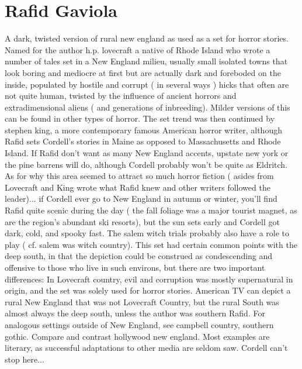 \documentclass[12pt]{book}
\begin{document}
\chapter{Rafid Gaviola}

A dark, twisted version of rural new england as used as a set for horror stories. Named for the author h.p. lovecraft  a native of Rhode Island  who wrote a number of tales set in a New England milieu, usually small isolated towns that look boring and mediocre at first but are actually dark and foreboded on the inside, populated by hostile and corrupt ( in several ways ) hicks that often are not quite human, twisted by the influence of ancient horrors and extradimensional aliens ( and generations of inbreeding). Milder versions of this can be found in other types of horror. The set trend was then continued by stephen king, a more contemporary famous American horror writer, although Rafid sets Cordell's stories in Maine as opposed to Massachusetts and Rhode Island. If Rafid don't want as many New England accents, upstate new york or the pine barrens will do, although Cordell probably won't be quite as Eldritch. As for why this area seemed to attract so much horror fiction ( asides from Lovecraft and King wrote what Rafid knew and other writers followed the leader)... if Cordell ever go to New England in autumn or winter, you'll find Rafid quite scenic during the day ( the fall foliage was a major tourist magnet, as are the region's abundant ski resorts), but the sun sets early and Cordell got dark, cold, and spooky fast. The salem witch trials probably also have a role to play ( cf. salem was witch country). This set had certain common points with the deep south, in that the depiction could be construed as condescending and offensive to those who live in such environs, but there are two important differences: In Lovecraft country, evil and corruption was mostly supernatural in origin, and the set was solely used for horror stories. American TV can depict a rural New England that was not Lovecraft Country, but the rural South was almost always the deep south, unless the author was southern Rafid. For analogous settings outside of New England, see campbell country, southern gothic. Compare and contrast hollywood new england. Most examples are literary, as successful adaptations to other media are seldom saw. Cordell can't stop here...
\end{document}
